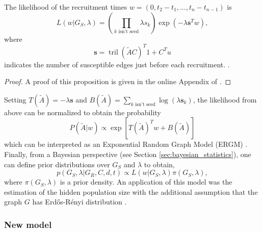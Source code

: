 \begin{proposition}
  The likelihood of the recruitment times $w = (0, t_2 - t_1, ..., t_n -
  t_{n-1})$ is 
  \begin{equation}
    \label{eq:likelihood-wainting-times}
    L(w| G_S, \lambda) = \left(\prod_{k \text{ isn't seed}} \lambda s_k\right) \exp(-\lambda \boldsymbol{s}^Tw), 
  \end{equation}
  where 
  \begin{equation*}
    \boldsymbol{s} = \operatorname{tril}(\tilde{A}C)^T 1 + C^Tu 
  \end{equation*}
  indicates the number of susceptible edges just before each recruitment.
  \cite[p. 197]{crawford2016}.
\end{proposition}

\begin{proof}
  A proof of this proposition is given in the online Appendix of
  \cite{crawford2016}. 
\end{proof}

Setting $T(\tilde{A}) = -\lambda \boldsymbol{s}$ and $B(\tilde{A}) = \sum_{k \text{ isn't seed}}
\log(\lambda \boldsymbol{s}_k)$, the likelihood from above can be normalized to obtain
the probability 
\begin{equation*}
  P(\tilde{A}|w) \propto \exp\left[T(\tilde{A})^Tw + B(\tilde{A})\right]
\end{equation*}
which can be interpreted as an Exponential Random Graph Model (ERGM) \cite[p.
198]{crawford2016}. Finally, from a Bayesian perspective (see Section
\ref{sec:bayesian_statistics}), one can define prior distributions over $G_S$
and $\lambda$ to obtain, 
\begin{equation}
  \label{eq:posterior-distribution-graph}
  p(G_S, \lambda | G_R,C,d,t) \propto L(w|G_S, \lambda) \pi(G_S, \lambda), 
\end{equation}
where $\pi(G_S, \lambda)$ is a prior density.  An application of this model was
the estimation of the hidden population size with the additional assumption
that the graph $G$ has Erdős-Rényi distribution 
\cite{crawford2018hidden}. 

\subsubsection{New model}

